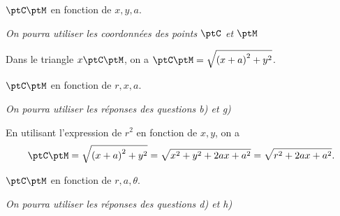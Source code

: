 




\begin{enonce}
	$\ptC\ptM$ en fonction de $x,y,a$. \minusMedskip
	
	{\itshape On pourra utiliser les coordonnées des points $\ptC$ et $\ptM$}
\end{enonce}


\begin{corrige}
	Dans le triangle $x\ptC\ptM$, on a $\ptC\ptM =  \sqrt{ \left(x + a\right)^2 + y^2}$.
\end{corrige}





\begin{enonce}
	$\ptC\ptM$ en fonction de  $r,x,a$. \minusMedskip
	
	{\itshape On pourra utiliser les réponses des questions b) et g)}
\end{enonce}


\begin{corrige}
	En utilisant l'expression de $r^2$ en fonction  de $x,y$, on a 
	\[
		\ptC\ptM =  \sqrt{ \left(x + a\right)^2 + y^2} =
		\sqrt{ x^2 + y^2 + 2ax + a^2} = \sqrt{ r^2 + 2ax + a^2 }.
	\]
\end{corrige}





\begin{enonce}
	$\ptC\ptM$ en fonction de $r,a,\theta$. \minusMedskip
	
	{\itshape On pourra utiliser les réponses des questions d) et h)}
\end{enonce}



